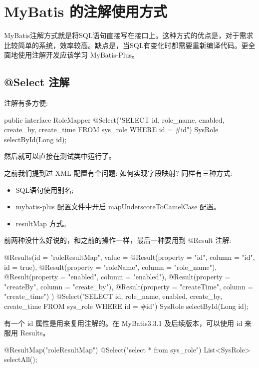 \section{MyBatis 的注解使用方式}

MyBatis注解方式就是将SQL语句直接写在接口上。这种方式的优点是，对于需求比较简单的系统，效率较高。缺点是，当SQL有变化时都需要重新编译代码。更全面地使用注解开发应该学习 MyBatis-Plus。

\subsection{@Select 注解}

注解有多方便:

\begin{Java}
public interface RoleMapper {
    @Select("SELECT id, role_name, enabled, create_by, create_time FROM sys_role WHERE id = #{id}")
    SysRole selectById(Long id);
}
\end{Java}

然后就可以直接在测试类中运行了。

之前我们提到过 XML 配置有个问题: 如何实现字段映射? 同样有三种方式:
\begin{itemize}
    \item SQL语句使用别名;
    \item mybatis-plus 配置文件中开启 mapUnderscoreToCamelCase 配置。
    \item resultMap 方式。
\end{itemize}

前两种没什么好说的，和之前的操作一样，最后一种要用到 @Result 注解:

\begin{Java}
@Results(id = "roleResultMap", value = {
        @Result(property = "id", column = "id", id = true),
        @Result(property = "roleName", column = "role_name"),
        @Result(property = "enabled", column = "enabled"),
        @Result(property = "createBy", column = "create_by"),
        @Result(property = "createTime", column = "create_time")
})
@Select("SELECT id, role_name, enabled, create_by, create_time FROM sys_role WHERE id = #{id}")
SysRole selectById(Long id);
\end{Java}

有一个 id 属性是用来复用注解的。在 MyBatis3.3.1 及后续版本，可以使用 id 来服用 Results。

\begin{Java}
@ResultMap("roleResultMap")
@Select("select * from sys_role")
List<SysRole> selectAll();
\end{Java}


